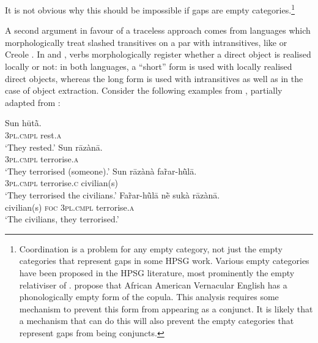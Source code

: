 \documentclass[output=paper
,notxmath 
 	        ,biblatex
                ,babelshorthands
                ,newtxmath
                ,draftmode
                ,colorlinks, citecolor=brown
]{langscibook}
\begin{document}
\noindent
It is not obvious why this should be impossible if gaps are empty
categories.\footnote{Coordination is a problem for any empty category,
  not just the empty categories that represent gaps in some HPSG
  work. Various empty categories have been proposed in the HPSG
  literature, most prominently the empty relativiser of
  \citet[Chapter~5]{Pollard:Sag:94}. \citet[Section~15.3.5]{Sag:Wasow:ea:03}
  propose that African American Vernacular English has a
  phonologically empty form of the copula. This analysis requires some
  mechanism to prevent this form from appearing as a conjunct. It is
  likely that a mechanism that can do this will also prevent the empty
  categories that represent gaps from being conjuncts.
 }

 A second argument in favour of a traceless approach comes from
 languages which morphologically treat slashed transitives on a par
 with intransitives, like  \citep{crysmann_b04yom} or
  Creole  \citep{Henri10}. In 
 and , verbs morphologically register whether a direct
 object is realised locally or not: in both languages, a ``short''
 form is used with locally realised direct objects, whereas the long
 form is used with intransitives as well as in the case of object
 extraction. Consider the following examples from ,
 partially adapted from \citet[632--633]{newman_p00}:

\ea
\gll Sun hūtā̀.\\
  \textsc{3pl.cmpl} rest.\textsc{a}\\
\glt `They rested.' \hfill \label{ex:UDC:Hau:intr}
\z
\eal
\label{ex:UDC:Hau:tr}
    \ex\label{ex:UDC:Hau:tr:a} 
    \gll Sun rāzànā.\footnotemark\\
         \textsc{3pl.cmpl} terrorise.\textsc{a}\\
    \glt `They terrorised (someone).'
    \ex\label{ex:UDC:Hau:tr:b} 
    \gll Sun rāzànà far̃ar-hū̀lā.\footnotemark\\
         \textsc{3pl.cmpl} terrorise.\textsc{c} civilian(s)\\
    \glt `They terrorised the civilians.'
    \ex 
    \gll Far̃ar-hū̀lā nḕ sukà rāzànā.\\
         civilian(s) \textsc{foc} \textsc{3pl.cmpl} terrorise.\textsc{a}\\
    \glt `The civilians, they terrorised.' 
\zl
\end{document}
